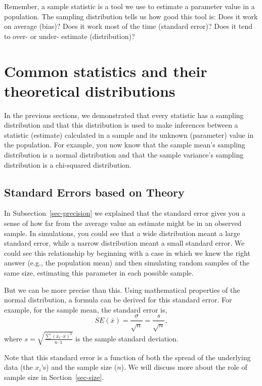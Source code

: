 \documentclass[
  letterpaper,
  DIV=11,
  numbers=noendperiod]{scrreprt}
\theoremstyle{definition}
\theoremstyle{remark}
\begin{document}
Remember, a sample statistic is a tool we use to estimate a parameter
value in a population. The sampling distribution tells us how good this
tool is: Does it work on average (bias)? Does it work most of the time
(standard error)? Does it tend to over- or under- estimate
(distribution)?

\hypertarget{sec-commonstat}{%
\section{Common statistics and their theoretical
distributions}\label{sec-commonstat}}

In the previous sections, we demonstrated that every statistic has a
sampling distribution and that this distribution is used to make
inferences between a statistic (estimate) calculated in a sample and its
unknown (parameter) value in the population. For example, you now know
that the sample mean's sampling distribution is a normal distribution
and that the sample variance's sampling distribution is a chi-squared
distribution.

\hypertarget{standard-errors-based-on-theory}{%
\subsection{Standard Errors based on
Theory}\label{standard-errors-based-on-theory}}

In Subsection~\ref{sec-precision} we explained that the standard error
gives you a sense of how far from the average value an estimate might be
in an observed sample. In simulations, you could see that a wide
distribution meant a large standard error, while a narrow distribution
meant a small standard error. We could see this relationship by
beginning with a case in which we knew the right answer (e.g., the
population mean) and then simulating random samples of the same size,
estimating this parameter in each possible sample.

But we can be more precise than this. Using mathematical properties of
the normal distribution, a formula can be derived for this standard
error. For example, for the sample mean, the standard error is,
\[SE(\bar{x}) = \frac{\sigma}{\sqrt{n}} = \frac{s}{\sqrt{n}},\] where
\(s = \sqrt{\frac{\sum (x_i – \bar{x})^2}{n – 1}}\) is the sample
standard deviation.

Note that this standard error is a function of both the spread of the
underlying data (the \(x_i\)'s) and the sample size (\(n\)). We will
discuss more about the role of sample size in Section~\ref{sec-size}.
\end{document}

